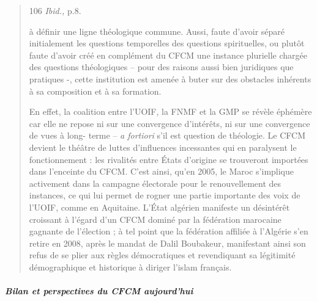 \begin{quote}
106 \emph{Ibid.,} p.8.



à définir une ligne théologique commune. Aussi, faute d'avoir séparé
initialement les questions temporelles des questions spirituelles, ou
plutôt faute d'avoir créé en complément du CFCM une instance plurielle
chargée des questions théologiques -- pour des raisons aussi bien
juridiques que pratiques -, cette institution est amenée à buter sur des
obstacles inhérents à sa composition et à sa formation.

En effet, la coalition entre l'UOIF, la FNMF et la GMP se révèle
éphémère car elle ne repose ni sur une convergence d'intérêts, ni sur
une convergence de vues à long- terme -- \emph{a fortiori} s'il est
question de théologie. Le CFCM devient le théâtre de luttes d'influences
incessantes qui en paralysent le fonctionnement : les rivalités entre
États d'origine se trouveront importées dans l'enceinte du CFCM. C'est
ainsi, qu'en 2005, le Maroc s'implique activement dans la campagne
électorale pour le renouvellement des instances, ce qui lui permet de
rogner une partie importante des voix de l'UOIF, comme en Aquitaine.
L'État algérien manifeste un désintérêt croissant à l'égard d'un CFCM
dominé par la fédération marocaine gagnante de l'élection ; à tel point
que la fédération affiliée à l'Algérie s'en retire en 2008, après le
mandat de Dalil Boubakeur, manifestant ainsi son refus de se plier aux
règles démocratiques et revendiquant sa légitimité démographique et
historique à diriger l'islam français.
\end{quote}

\hypertarget{bilan-et-perspectives-du-cfcm-aujourdhui}{%
\subparagraph{Bilan et perspectives du CFCM
aujourd'hui}\label{bilan-et-perspectives-du-cfcm-aujourdhui}}


